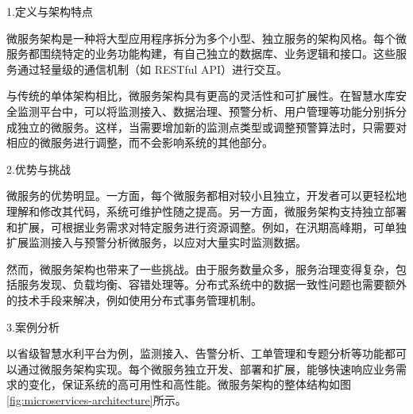 1.定义与架构特点

微服务架构是一种将大型应用程序拆分为多个小型、独立服务的架构风格。每个微服务都围绕特定的业务功能构建，有自己独立的数据库、业务逻辑和接口。这些服务通过轻量级的通信机制（如 RESTful API）进行交互。

与传统的单体架构相比，微服务架构具有更高的灵活性和可扩展性。在智慧水库安全监测平台中，可以将监测接入、数据治理、预警分析、用户管理等功能分别拆分成独立的微服务。这样，当需要增加新的监测点类型或调整预警算法时，只需要对相应的微服务进行调整，而不会影响系统的其他部分。

2.优势与挑战

微服务的优势明显。一方面，每个微服务都相对较小且独立，开发者可以更轻松地理解和修改其代码，系统可维护性随之提高。另一方面，微服务架构支持独立部署和扩展，可根据业务需求对特定服务进行资源调整。例如，在汛期高峰期，可单独扩展监测接入与预警分析微服务，以应对大量实时监测数据。

然而，微服务架构也带来了一些挑战。由于服务数量众多，服务治理变得复杂，包括服务发现、负载均衡、容错处理等。分布式系统中的数据一致性问题也需要额外的技术手段来解决，例如使用分布式事务管理机制。

3.案例分析

以省级智慧水利平台为例，监测接入、告警分析、工单管理和专题分析等功能都可以通过微服务架构实现。每个微服务独立开发、部署和扩展，能够快速响应业务需求的变化，保证系统的高可用性和高性能。微服务架构的整体结构如图\ref{fig:microservices-architecture}所示。

